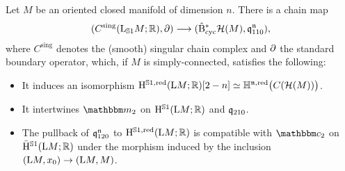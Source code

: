 \documentclass[\MainFolder/Text.tex]{subfiles}
\begin{document}
\begin{Conjecture}\label{Conj:StringTopology}
Let $M$ be an oriented closed manifold of dimension $n$. There is a chain map 
$$(C^{\mathrm{sing}}(\mathrm{L}_{\mathbb{S}{1}}M; \mathbb{R}),\partial)\longrightarrow (\hat{\mathrm{B}}_{\mathrm{cyc}}^*\mathcal{H}(M),\mathfrak{q}_{110}^{\mathfrak{n}}), $$
where $C^{\mathrm{sing}}$ denotes the (smooth) singular chain complex and $\partial$ the standard boundary operator, which, if $M$ is simply-connected, satisfies the following:
\begin{itemize}
\item It induces an isomorphism $\mathrm{H}^{\mathbb{S}{1}, \mathrm{red}}(\mathrm{L} M; \mathbb{R})[2-n] \simeq \mathbb{H}^{\mathfrak{n},\mathrm{red}}\bigl(C(\mathcal{H}(M))\bigr)$.
\item It intertwines $\StringOp_2$ on $\mathrm{H}^{\mathbb{S}{1}}(\mathrm{L} M; \mathbb{R})$ and $\mathfrak{q}_{210}$.
\item The pullback of $\mathfrak{q}_{120}^{\mathfrak{n}}$ to $\mathrm{H}^{\mathbb{S}{1}, \mathrm{red}}(\mathrm{L} M; \mathbb{R})$ is compatible with $\StringCoOp_2$ on $\bar{\mathrm{H}}^{\mathbb{S}{1}}(\mathrm{L} M; \mathbb{R})$ under the morphism induced by the inclusion $(\mathrm{L} M, x_0) \rightarrow (\mathrm{L} M,M)$.
\end{itemize}
\end{Conjecture}
\end{document}
